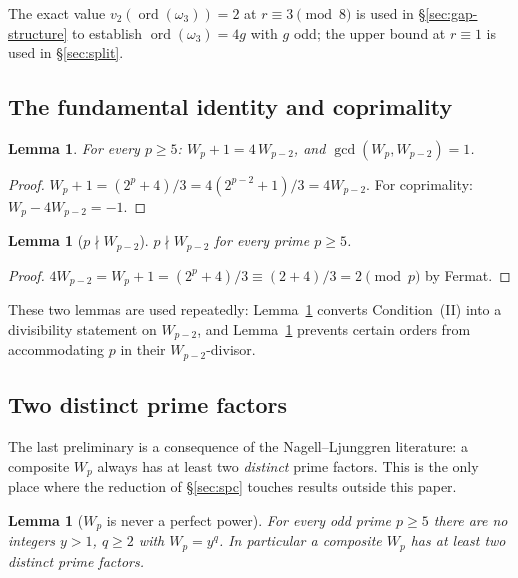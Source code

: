 \documentclass[11pt]{amsart}
\theoremstyle{plain}
\newtheorem{lemma}[theorem]{Lemma}
\theoremstyle{definition}
\theoremstyle{remark}
\numberwithin{equation}{section}
\newcommand{\ord}{\operatorname{ord}}
\begin{document}
The exact value $v_2(\ord(\omega_3)) = 2$ at $r \equiv 3 \pmod 8$ is used in \S\ref{sec:gap-structure} to establish $\ord(\omega_3) = 4 g$ with $g$ odd; the upper bound at $r \equiv 1$ is used in \S\ref{sec:split}.

\subsection{The fundamental identity and coprimality}

\begin{lemma}\label{lem:fundamental}
For every $p \geq 5$: $W_p + 1 = 4\,W_{p-2}$, and $\gcd(W_p, W_{p-2}) = 1$.
\end{lemma}

\begin{proof}
$W_p + 1 = (2^p + 4)/3 = 4 (2^{p-2} + 1)/3 = 4 W_{p-2}$. For coprimality: $W_p - 4 W_{p-2} = -1$.
\end{proof}

\begin{lemma}[$p \nmid W_{p-2}$]\label{lem:pndivW}
$p \nmid W_{p-2}$ for every prime $p \geq 5$.
\end{lemma}

\begin{proof}
$4 W_{p-2} = W_p + 1 = (2^p + 4)/3 \equiv (2 + 4)/3 = 2 \pmod p$ by Fermat.
\end{proof}

These two lemmas are used repeatedly: Lemma~\ref{lem:fundamental} converts Condition~(II) into a divisibility statement on $W_{p-2}$, and Lemma~\ref{lem:pndivW} prevents certain orders from accommodating $p$ in their $W_{p-2}$-divisor.

\subsection{Two distinct prime factors}

The last preliminary is a consequence of the Nagell--Ljunggren literature: a composite $W_p$ always has at least two \emph{distinct} prime factors. This is the only place where the reduction of \S\ref{sec:spc} touches results outside this paper.

\begin{lemma}[$W_p$ is never a perfect power]\label{lem:w1-empty}
For every odd prime $p \geq 5$ there are no integers $y > 1$, $q \geq 2$ with $W_p = y^q$. In particular a composite $W_p$ has at least two distinct prime factors.
\end{lemma}
\end{document}
